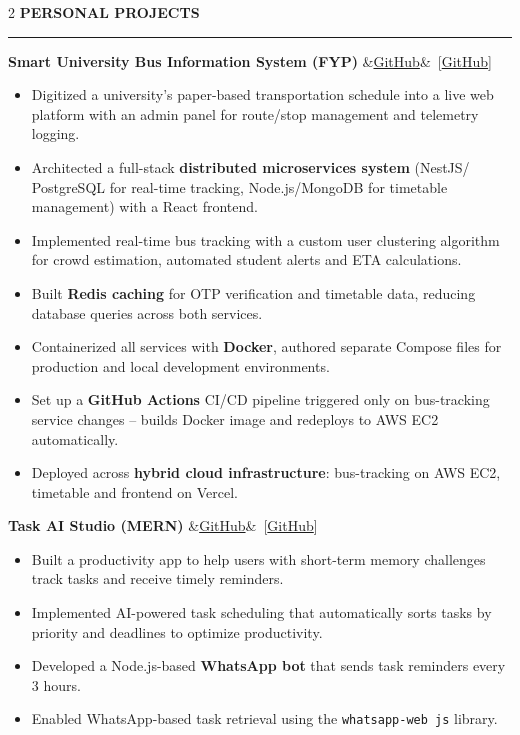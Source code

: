 \documentclass[12pt,a4paper]{article}
\newcommand{\leftsection}[1]{%
  \vspace{6pt}%
  {\color{accentcyan}\Large\bfseries #1}\\[-2pt]%
  {\color{sectionline}\rule{\linewidth}{1pt}}%
  \vspace{3pt}%
}
\newcommand{\projheading}[2]{%
  \vspace{5pt}%
  {\bfseries\color{darktext} #1}%
  \ifx&#2&\else~{\small\color{accentcyan}[#2]}\fi%
  \vspace{1pt}%
}
\newenvironment{cvitems}{%
  \begin{itemize}[leftmargin=1em, itemsep=0pt, parsep=0pt, topsep=2pt, label={\color{accentcyan}\tiny$\bullet$}]%
  \small\color{bodytext}%
}{%
  \end{itemize}%
}
\begin{document}
\begin{paracol}{2}
\leftsection{PERSONAL PROJECTS}

\projheading{Smart University Bus Information System (FYP)}{\href{https://github.com/dev-fahad785/FYP-SUBIS}{GitHub}}
\begin{cvitems}
  \item Digitized a university's paper-based transportation schedule into a live web platform with an admin panel for route/stop management and telemetry logging.
  \item Architected a full-stack \textbf{distributed microservices system} (NestJS/
  PostgreSQL for real-time tracking, Node.js/MongoDB for timetable management) with a React frontend.
  \item Implemented real-time bus tracking with a custom user clustering algorithm for crowd estimation, automated student alerts and ETA calculations.
  \item Built \textbf{Redis caching} for OTP verification and timetable data, reducing database queries across both services.
  \item Containerized all services with \textbf{Docker}, authored separate Compose files for production and local development environments.
  \item Set up a \textbf{GitHub Actions} CI/CD pipeline triggered only on bus-tracking service changes -- builds Docker image and redeploys to AWS EC2 automatically.
  \item Deployed across \textbf{hybrid cloud infrastructure}: bus-tracking on AWS EC2, timetable and frontend on Vercel.
\end{cvitems}

\projheading{Task AI Studio (MERN)}{\href{https://github.com/dev-fahad785/task-manager}{GitHub}}
\begin{cvitems}
  \item Built a productivity app to help users with short-term memory challenges track tasks and receive timely reminders.
  \item Implemented AI-powered task scheduling that automatically sorts tasks by priority and deadlines to optimize productivity.
  \item Developed a Node.js-based \textbf{WhatsApp bot} that sends task reminders every 3 hours.
  \item Enabled WhatsApp-based task retrieval using the \texttt{whatsapp-web
  js} library.
\end{cvitems}


\end{paracol}
\end{document}
